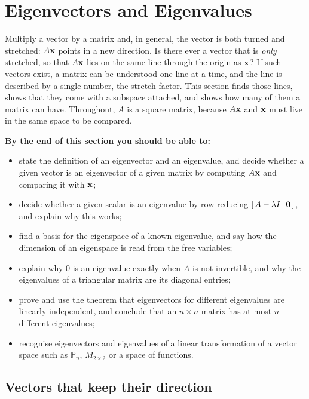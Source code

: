 \documentclass[11pt]{article}
\begin{document}
\section{Eigenvectors and Eigenvalues}

\begin{guide}
Multiply a vector by a matrix and, in general, the vector is both turned and stretched: $A\mathbf{x}$ points in a new direction. Is there ever a vector that is \emph{only} stretched, so that $A\mathbf{x}$ lies on the same line through the origin as $\mathbf{x}$? If such vectors exist, a matrix can be understood one line at a time, and the line is described by a single number, the stretch factor. This section finds those lines, shows that they come with a subspace attached, and shows how many of them a matrix can have. Throughout, $A$ is a square matrix, because $A\mathbf{x}$ and $\mathbf{x}$ must live in the same space to be compared.
\end{guide}

\textbf{By the end of this section you should be able to:}
\begin{itemize}
  \item state the definition of an eigenvector and an eigenvalue, and decide whether a given vector is an eigenvector of a given matrix by computing $A\mathbf{x}$ and comparing it with $\mathbf{x}$;
  \item decide whether a given scalar is an eigenvalue by row reducing $[\,A-\lambda I\ \ \mathbf{0}\,]$, and explain why this works;
  \item find a basis for the eigenspace of a known eigenvalue, and say how the dimension of an eigenspace is read from the free variables;
  \item explain why $0$ is an eigenvalue exactly when $A$ is not invertible, and why the eigenvalues of a triangular matrix are its diagonal entries;
  \item prove and use the theorem that eigenvectors for different eigenvalues are linearly independent, and conclude that an $n\times n$ matrix has at most $n$ different eigenvalues;
  \item recognise eigenvectors and eigenvalues of a linear transformation of a vector space such as $\mathbb{P}_n$, $M_{2\times2}$ or a space of functions.
\end{itemize}

\subsection*{Vectors that keep their direction}
\end{document}
